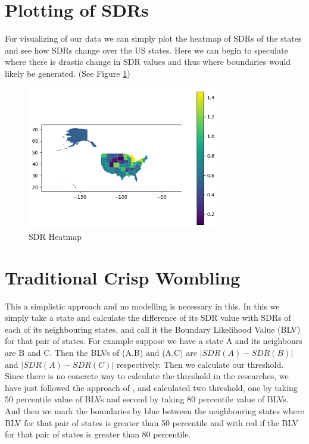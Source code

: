\documentclass[enabledeprecatedfontcommands,parskip=half,twoside=semi,BCOR=0mm]{scrreprt}
\numberwithin{equation}{chapter}
\theoremstyle{definition}
\theoremstyle{remark}
\begin{document}
    \section{Plotting of SDRs}
    
    For visualizing of our data we can simply plot the heatmap of SDRs of the states  and see how SDRs change over the US states. Here we can begin to speculate where there is drastic change in SDR values and thus where boundaries would likely be generated. (See Figure \ref{fig:Figure 2})
    \begin{figure}[h]
    \centering
    \includegraphics[width=0.75\textwidth]{SDR.png}
    \caption{SDR Heatmap}
    \label{fig:Figure 2}
    \end{figure}
    
    \section{Traditional Crisp Wombling}
    
    This a simplistic approach and no modelling is necessary in this. In this we simply take a state and calculate the difference of its SDR value with SDRs of each of its neighbouring states, and call it the Boundary Likelihood Value (BLV) for that pair of states. For example suppose we have a state A and its neighbours are B and C. Then the BLVs of (A,B) and (A,C) are \(|SDR(A)-SDR(B)|\) and \(|SDR(A)-SDR(C)|\) respectively. Then we calculate our threshold. Since there is no concrete way to calculate the threshold in the researches, we have just followed the approach of \cite{Lu_Carlin.2005}, and calculated two threshold, one by taking 50 percentile value of BLVs and second by taking 80 percentile value of BLVs. And then we mark the boundaries by blue between the neighbouring states where BLV for that pair of states is greater than 50 percentile and with red if the BLV for that pair of states is greater than 80 percentile.
\end{document}
